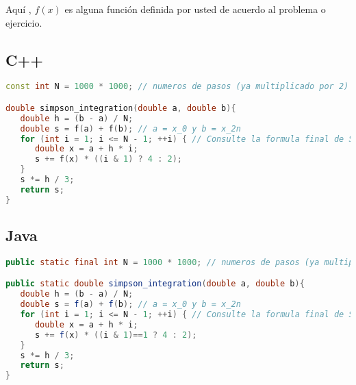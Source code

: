 
Aquí , $f(x)$ es alguna función definida por usted de acuerdo al problema o ejercicio.
\subsection{C++}
\begin{lstlisting}[language=C++]
const int N = 1000 * 1000; // numeros de pasos (ya multiplicado por 2)

double simpson_integration(double a, double b){
   double h = (b - a) / N;
   double s = f(a) + f(b); // a = x_0 y b = x_2n
   for (int i = 1; i <= N - 1; ++i) { // Consulte la formula final de Simpson.
      double x = a + h * i;
      s += f(x) * ((i & 1) ? 4 : 2);
   }
   s *= h / 3;
   return s;
}

\end{lstlisting} 

\subsection{Java}
\begin{lstlisting}[language=Java]
public static final int N = 1000 * 1000; // numeros de pasos (ya multiplicado por 2

public static double simpson_integration(double a, double b){
   double h = (b - a) / N;
   double s = f(a) + f(b); // a = x_0 y b = x_2n
   for (int i = 1; i <= N - 1; ++i) { // Consulte la formula final de Simpson.
      double x = a + h * i;
      s += f(x) * ((i & 1)==1 ? 4 : 2);
   }
   s *= h / 3;
   return s;
}
\end{lstlisting} 